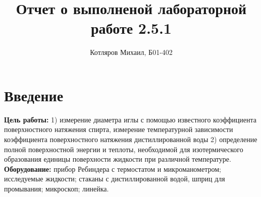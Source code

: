 \documentclass[a4paper]{article}
\title{\textbf{Отчет о выполненой лабораторной работе 2.5.1}}
\date{}
\author{Котляров Михаил, Б01-402}
\begin{document}
\maketitle
	
	\section{Введение}
	
	\textbf{Цель работы:} 1) измерение диаметра иглы с помощью известного коэффициента поверхностного натяжения спирта, измерение температурной зависимости коэффициента поверхностного натяжения дистиллированной воды  2) определение полной поверхностной энергии  и теплоты, необходимой для изотермического образования единицы  поверхности жидкости  при различной температуре. \\
	\textbf{Оборудование:} прибор Ребиндера с термостатом и микроманометром; исследуемые жидкости; стаканы с дистиллированной водой, шприц для промывания; микроскоп; линейка.
	
\end{document}

